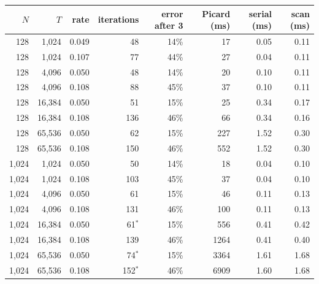 \begin{tabular}{rrrrrrrr}
\toprule
$N$ & $T$ & rate & iterations & error after 3 & Picard (ms) & serial (ms) & scan (ms)\\
\midrule
128 & 1{,}024 & 0.049 & 48 & 14\% & 17 & 0.05 & 0.11\\
128 & 1{,}024 & 0.107 & 77 & 44\% & 27 & 0.04 & 0.11\\
128 & 4{,}096 & 0.050 & 48 & 14\% & 20 & 0.10 & 0.11\\
128 & 4{,}096 & 0.108 & 88 & 45\% & 37 & 0.10 & 0.11\\
128 & 16{,}384 & 0.050 & 51 & 15\% & 25 & 0.34 & 0.17\\
128 & 16{,}384 & 0.108 & 136 & 46\% & 66 & 0.34 & 0.16\\
128 & 65{,}536 & 0.050 & 62 & 15\% & 227 & 1.52 & 0.30\\
128 & 65{,}536 & 0.108 & 150 & 46\% & 552 & 1.52 & 0.30\\
1{,}024 & 1{,}024 & 0.050 & 50 & 14\% & 18 & 0.04 & 0.10\\
1{,}024 & 1{,}024 & 0.108 & 103 & 45\% & 37 & 0.04 & 0.10\\
1{,}024 & 4{,}096 & 0.050 & 61 & 15\% & 46 & 0.11 & 0.13\\
1{,}024 & 4{,}096 & 0.108 & 131 & 46\% & 100 & 0.11 & 0.13\\
1{,}024 & 16{,}384 & 0.050 & 61$^*$ & 15\% & 556 & 0.41 & 0.42\\
1{,}024 & 16{,}384 & 0.108 & 139 & 46\% & 1264 & 0.41 & 0.40\\
1{,}024 & 65{,}536 & 0.050 & 74$^*$ & 15\% & 3364 & 1.61 & 1.68\\
1{,}024 & 65{,}536 & 0.108 & 152$^*$ & 46\% & 6909 & 1.60 & 1.68\\
\bottomrule
\end{tabular}
